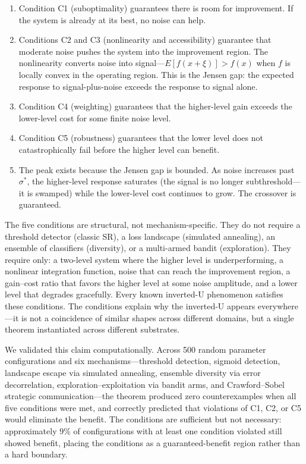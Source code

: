 \documentclass[12pt,letterpaper]{article}
\theoremstyle{definition}
\theoremstyle{remark}
\begin{document}
\begin{enumerate}
    \item Condition C1 (suboptimality) guarantees there is room for improvement. If the system is already at its best, no noise can help.
    \item Conditions C2 and C3 (nonlinearity and accessibility) guarantee that moderate noise pushes the system into the improvement region. The nonlinearity converts noise into signal---$E[f(x + \xi)] > f(x)$ when $f$ is locally convex in the operating region. This is the Jensen gap: the expected response to signal-plus-noise exceeds the response to signal alone.
    \item Condition C4 (weighting) guarantees that the higher-level gain exceeds the lower-level cost for some finite noise level.
    \item Condition C5 (robustness) guarantees that the lower level does not catastrophically fail before the higher level can benefit.
    \item The peak exists because the Jensen gap is bounded. As noise increases past~$\sigma^*$, the higher-level response saturates (the signal is no longer subthreshold---it is swamped) while the lower-level cost continues to grow. The crossover is guaranteed.
\end{enumerate}

The five conditions are structural, not mechanism-specific. They do not require a threshold detector (classic SR), a loss landscape (simulated annealing), an ensemble of classifiers (diversity), or a multi-armed bandit (exploration). They require only: a two-level system where the higher level is underperforming, a nonlinear integration function, noise that can reach the improvement region, a gain--cost ratio that favors the higher level at some noise amplitude, and a lower level that degrades gracefully. Every known inverted-U phenomenon satisfies these conditions. The conditions explain why the inverted-U appears everywhere---it is not a coincidence of similar shapes across different domains, but a single theorem instantiated across different substrates.

We validated this claim computationally. Across 500 random parameter configurations and six mechanisms---threshold detection, sigmoid detection, landscape escape via simulated annealing, ensemble diversity via error decorrelation, exploration--exploitation via bandit arms, and Crawford--Sobel strategic communication---the theorem produced zero counterexamples when all five conditions were met, and correctly predicted that violations of C1, C2, or C5 would eliminate the benefit. The conditions are sufficient but not necessary: approximately 9\% of configurations with at least one condition violated still showed benefit, placing the conditions as a guaranteed-benefit region rather than a hard boundary.
\end{document}
